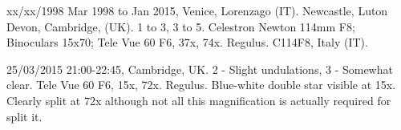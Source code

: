 \item xx/xx/1998 Mar 1998 to Jan 2015, Venice, Lorenzago (IT). Newcastle, Luton Devon, Cambridge, (UK). 1 to 3, 3 to 5. Celestron Newton 114mm F8; Binoculars 15x70; Tele Vue 60 F6, 37x, 74x. Regulus. C114F8, Italy (IT).
\item 25/03/2015 21:00-22:45, Cambridge, UK. 2 - Slight undulations, 3 - Somewhat clear. Tele Vue 60 F6, 15x, 72x. Regulus. Blue-white double star visible at 15x. Clearly split at 72x although not all this magnification is actually required for split it.
